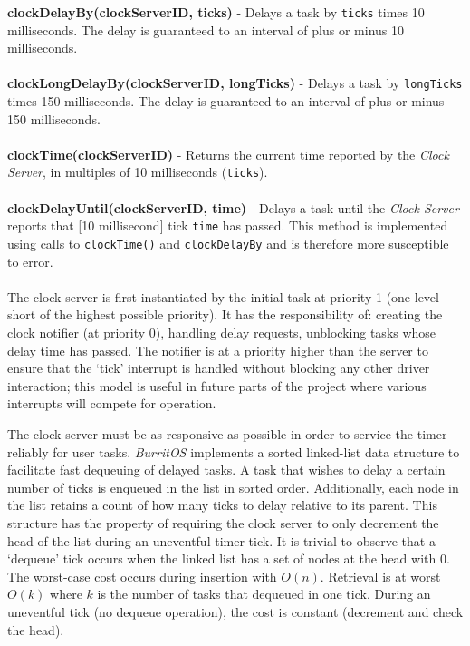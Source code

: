 \documentclass[twoside,a4paper]{refart}
\begin{document}
\textbf{clockDelayBy(clockServerID, ticks)} - Delays a task by \verb~ticks~ times 10 milliseconds. The delay is guaranteed to an interval of plus or minus 10 milliseconds.\\\\
\textbf{clockLongDelayBy(clockServerID, longTicks)} - Delays a task by \verb~longTicks~ times 150 milliseconds. The delay is guaranteed to an interval of plus or minus 150 milliseconds.\\\\
\textbf{clockTime(clockServerID)} - Returns the current time reported by the \textit{Clock Server}, in multiples of 10 milliseconds (\verb~ticks~).\\\\
\textbf{clockDelayUntil(clockServerID, time)} - Delays a task until the \textit{Clock Server} reports that [10 millisecond] tick \verb~time~ has passed. This method is implemented using calls to \verb~clockTime()~ and \verb~clockDelayBy~ and is therefore more susceptible to error.\\\\

The clock server is first instantiated by the initial task at priority 1 (one level short of the highest possible priority). It has the responsibility of: creating the clock notifier (at priority 0), handling delay requests, unblocking tasks whose delay time has passed. The notifier is at a priority higher than the server to ensure that the ‘tick’ interrupt is handled without blocking any other driver interaction; this model is useful in future parts of the project where various interrupts will compete for operation.

The clock server must be as responsive as possible in order to service the timer reliably for user tasks. \textit{BurritOS} implements a sorted linked-list data structure to facilitate fast dequeuing of delayed tasks. A task that wishes to delay a certain number of ticks is enqueued in the list in sorted order. Additionally, each node in the list retains a count of how many ticks to delay relative to its parent. This structure has the property of requiring the clock server to only decrement the head of the list during an uneventful timer tick. It is trivial to observe that a ‘dequeue’ tick occurs when the linked list has a set of nodes at the head with 0. The worst-case cost occurs during insertion with $O(n)$. Retrieval is at worst $O(k)$ where $k$ is the number of tasks that dequeued in one tick. During an uneventful tick (no dequeue operation), the cost is constant (decrement and check the head).
\end{document}
